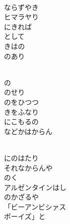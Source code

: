 \documentclass[10pt,b5j]{tarticle} %
\begin{document}
\begin{enumerate}
\begin{minipage}[c]{\blocksize}
        \vspace{\linespace}
        \item~\\
        ならずやき\\
        ヒマラヤり\\
        にきれば\\
        として\\
        きはの\\
        のあり
        
    \end{minipage}
    \begin{minipage}[c]{\blocksize}
        
        \vspace{\linespace}
        \item~\\
        の\\
        のせり\\
        のをひつつ\\
        きをふなり\\
        にこもるの\\
        などかはからん
        
    \end{minipage}
    \begin{minipage}[c]{\blocksize}
        
        \vspace{\linespace}
        \item~\\
        にのはたり\\
        それなからんや\\
        のく\\
        アルゼンタインはし\\
        のかざるや\\
        「ビーアンビシァス\\
        ボーイズ」と
        

\end{minipage}
\end{enumerate}
\end{document}
